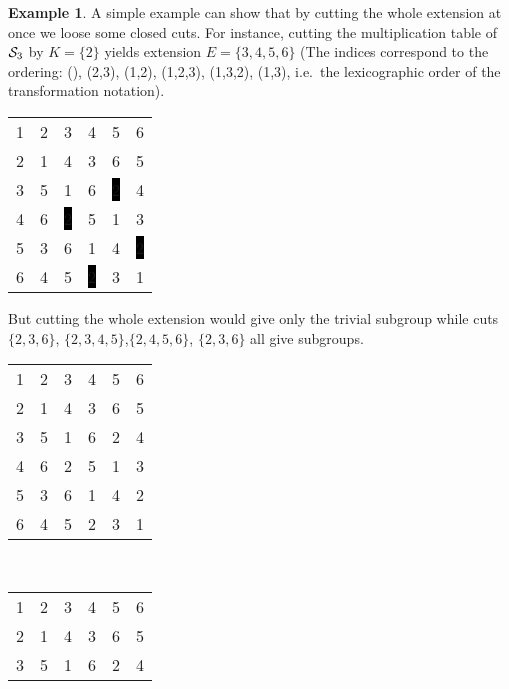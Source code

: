 \documentclass{article}
\theoremstyle{plain}
\theoremstyle{definition}
\newtheorem{example}[theorem]{Example}
\newcommand{\cS}{{\cal S}}
\begin{document}
\begin{example}
\label{ex:S4cutting2}
A simple example can show that by cutting the whole extension at once we loose some closed cuts. For instance, cutting the multiplication table of $\cS_3$ by $K=\{2\}$ yields extension $E=\{3,4,5,6\}$ (The indices correspond to the ordering:  (), (2,3), (1,2), (1,2,3), (1,3,2), (1,3), i.e.\ the lexicographic order of the transformation notation).
\begin{center}
\setlength{\fboxsep}{1pt}
\begin{tabular}{cccccc}
1&\color{lgr}2&3&4&5&6\\
\color{lgr}2&\color{lgr}1&\color{lgr}4&\color{lgr}3&\color{lgr}6&\color{lgr}5\\
3&\color{lgr}5&1&6&\color{white}\colorbox{black}{2}&4\\
4&\color{lgr}6&\color{white}\colorbox{black}{2}&5&1&3\\
5&\color{lgr}3&6&1&4&\color{white}\colorbox{black}{2}\\
6&\color{lgr}4&5&\color{white}\colorbox{black}{2}&3&1\\
\end{tabular}
\end{center}
But cutting the whole extension would give only the trivial subgroup while cuts $\{2,3,6\}$, $\{2,3,4,5\}$,$\{2,4,5,6\}$, $\{2,3,6\}$ all give subgroups.
\begin{center}
\begin{tabular}{@{}c@{}c@{}c@{}c@{}c@{}c@{}}
1&\color{lgr}2&\color{lgr}3&4&5&\color{lgr}6\\
\color{lgr}2&\color{lgr}1&\color{lgr}4&\color{lgr}3&\color{lgr}6&\color{lgr}5\\
\color{lgr}3&\color{lgr}5&\color{lgr}1&\color{lgr}6&\color{lgr}2&\color{lgr}4\\
4&\color{lgr}6&\color{lgr}2&5&1&\color{lgr}3\\
5&\color{lgr}3&\color{lgr}6&1&4&\color{lgr}2\\
\color{lgr}6&\color{lgr}4&\color{lgr}5&\color{lgr}2&\color{lgr}3&\color{lgr}1\\
\end{tabular}\ \ \ \ 
\begin{tabular}{@{}c@{}c@{}c@{}c@{}c@{}c@{}}
1&\color{lgr}2&\color{lgr}3&\color{lgr}4&\color{lgr}5&6\\
\color{lgr}2&\color{lgr}1&\color{lgr}4&\color{lgr}3&\color{lgr}6&\color{lgr}5\\
\color{lgr}3&\color{lgr}5&\color{lgr}1&\color{lgr}6&\color{lgr}2&\color{lgr}4\\

\end{tabular}
\end{center}
\end{example}
\end{document}
